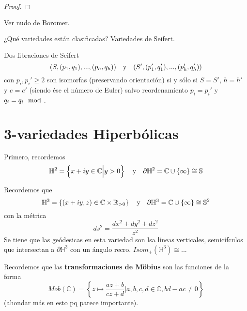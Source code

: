 \documentclass[12pt]{report}
\theoremstyle{largebreak}
\begin{document}
    \begin{proof}
        
    \end{proof}

    \begin{obs}
        Ver nudo de Boromer.
    \end{obs}

    ¿Qué variedades están clasificadas? Variedades de Seifert.

    \begin{cor}
        Dos fibraciones de Seifert
        \begin{equation*}
            (S,(p_1,q_1),...,(p_h,q_h))\quad\textup{y}\quad(S',(p_1',q_1'),...,(p_h',q_h'))
        \end{equation*}
        con $p_i,p_i'\geq 2$ son isomorfas (preservando orientación) si y sólo si $S=S'$, $h=h'$ y $e=e'$ (siendo ése el número de Euler) salvo reordenamiento $p_i=p_i'$ y $q_i=q_i\mod $.
    \end{cor}

    \section{3-variedades Hiperbólicas}

    Primero, recordemos
    \begin{equation*}
        \mathbb{H}^2=\left\{x+iy\in\mathbb{C}\Big|y>0 \right\}\quad\textup{y}\quad\partial\mathbb{H}^2=\mathbb{C}\cup\left\{\infty\right\}\cong\mathbb{S}
    \end{equation*}

    \begin{obs}
        Recordemos que
        \begin{equation*}
            \mathbb{H}^3=\left\{(x+iy,z)\in\mathbb{C}\times\mathbb{R}_{ >0}\right\}\quad\textup{y}\quad\partial\mathbb{H}^3=\mathbb{C}\cup\left\{\infty\right\}\cong\mathbb{S}^2
        \end{equation*}
        con la métrica
        \begin{equation*}
            ds^2=\frac{dx^2+dy^2+dz^2}{z^2}
        \end{equation*}
        Se tiene que las geódesicas en esta variedad son lsa líneas verticales, semicífculos que intersectan a $\partial\mathbb{H}^3$ con un ángulo recro. $Isom_{ +}(\mathbb{H}^3)\cong$...
    \end{obs}

    \begin{obs}
        Recordemos que las \textbf{transformaciones de Möbius} son las funciones de la forma
        \begin{equation*}
            Mob(\mathbb{C})=\left\{z\mapsto\frac{az+b}{cz+d}\Big|a,b,c,d\in\mathbb{C},bd-ac\neq0 \right\}
        \end{equation*}
        (ahondar más en esto pq parece importante).
    \end{obs}
\end{document}
